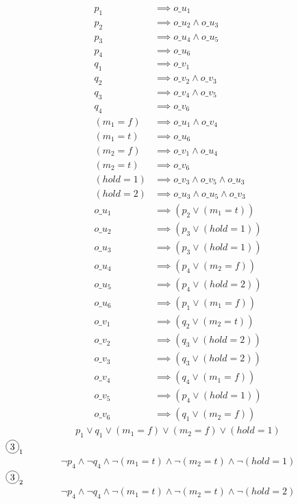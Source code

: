 \documentclass{article}
\newcommand*\circled[1]{\tikz[baseline=(char.base)]{
            \node[shape=circle,draw,inner sep=2pt] (char) {#1};}}
\begin{document}
\circled{1}
\begin{align*}
  p_1 &\implies o\_u_1 \\
  p_2 &\implies o\_u_2 \land o\_u_3 \\
  p_3 &\implies o\_u_4 \land o\_u_5 \\
  p_4 &\implies o\_u_6 \\
  q_1 &\implies o\_v_1 \\
  q_2 &\implies o\_v_2 \land o\_v_3 \\
  q_3 &\implies o\_v_4 \land o\_v_5 \\
  q_4 &\implies o\_v_6 \\
  (m_1=f) &\implies o\_u_1 \land o\_v_4 \\
  (m_1=t) &\implies o\_u_6 \\
  (m_2=f) &\implies o\_v_1 \land o\_u_4  \\
  (m_2=t) &\implies o\_v_6 \\
  (hold=1) &\implies o\_v_3 \land o\_v_5 \land o\_u_3 \\
  (hold=2) &\implies o\_u_3 \land o\_u_5 \land o\_v_3 \\
  o\_u_1 &\implies (p_2 \lor (m_1=t)) \\
  o\_u_2 &\implies (p_3 \lor (hold=1)) \\
  o\_u_3 &\implies (p_3 \lor (hold=1)) \\
  o\_u_4 &\implies (p_4 \lor (m_2=f)) \\
  o\_u_5 &\implies (p_4 \lor (hold=2)) \\
  o\_u_6 &\implies (p_1 \lor (m_1=f)) \\
  o\_v_1 &\implies (q_2 \lor (m_2=t)) \\
  o\_v_2 &\implies (q_3 \lor (hold=2)) \\
  o\_v_3 &\implies (q_3 \lor (hold=2)) \\
  o\_v_4 &\implies (q_4 \lor (m_1=f)) \\
  o\_v_5 &\implies (p_4 \lor (hold=1)) \\
  o\_v_6 &\implies (q_1 \lor (m_2=f))
\end{align*}
\circled{2}
\begin{align*}
  p_1 \lor q_1 \lor (m_1=f) \lor (m_2=f) \lor (hold=1)
\end{align*}
$\circled{3}_1$
\begin{align*}
  \neg p_4 \land \neg q_4 \land \neg (m_1=t) \land
  \neg (m_2=t) \land \neg (hold=1)
\end{align*}
$\circled{3}_2$
\begin{align*}
  \neg p_4 \land \neg q_4 \land \neg (m_1=t) \land
  \neg (m_2=t) \land \neg (hold=2)
\end{align*}
\end{document}
